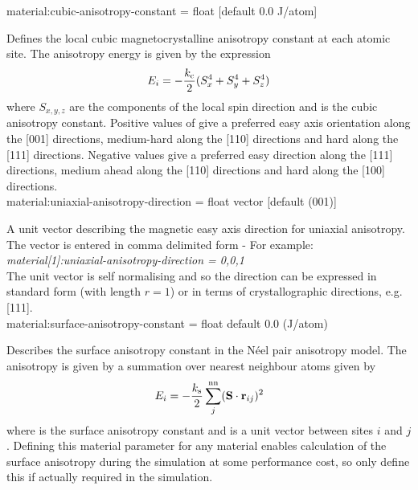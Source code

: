 
{\zicf material:cubic-anisotropy-constant = float [default 0.0 J/atom]}
  Defines the local cubic magnetocrystalline anisotropy constant at each atomic site. The anisotropy energy is given by the expression
\begin{equation*}
E_i = -\frac{k_{\mathrm{c}}}{2} (S_x^4 + S_y^4 + S_z^4)
\end{equation*}
where $S_{x,y,z}$ are the components of the local spin direction and \kc is the cubic anisotropy constant. Positive values of \kc give a preferred easy axis orientation along the [001] directions, medium-hard along the [110] directions and hard along the [111] directions. Negative values give a preferred easy direction along the [111] directions, medium ahead along the [110] directions and hard along the [100] directions. \\

{\zicf material:uniaxial-anisotropy-direction = float vector [default (001)]} A unit vector \ei describing the magnetic easy axis direction for uniaxial anisotropy. The vector is entered in comma delimited form - For example:\\

\textit{material[1]:uniaxial-anisotropy-direction = 0,0,1}\\

\noindent The unit vector is self normalising and so the direction can be expressed in standard form (with length $r =  1$) or in terms of crystallographic directions, e.g. [111].\\



{\zicf material:surface-anisotropy-constant = float default 0.0 (J/atom)} Describes the surface anisotropy constant in the N\'eel pair anisotropy model. The anisotropy is given by a summation over nearest neighbour atoms given by
\begin{equation*}
E_i = -\frac{k_{\mathrm{s}}}{2} \sum_j^{\mathrm{nn}} (\mathbf{S} \cdot \mathbf{r}_{ij} )^2
\end{equation*}
where \ksurf is the surface anisotropy constant and \rij is a unit vector between sites $i$ and $j$. Defining this material parameter for any material enables calculation of the surface anisotropy during the simulation at some performance cost, so only define this if actually required in the simulation. \\


